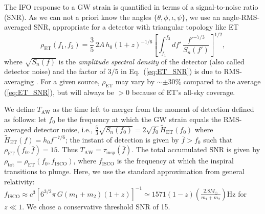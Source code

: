 \documentclass{aa}
\newcommand{\be}{\begin{equation}}
\newcommand{\ee}{\end{equation}}
\newcommand{\f}{\frac}
\begin{document}
The IFO response to a GW strain is quantified in terms of a signal-to-noise ratio (SNR).
As we can not a priori know the angles $\{\theta,\phi,\iota,\psi\}$, we use an angle-RMS-averaged SNR, 
appropriate for a detector with triangular topology like ET
%
\be
\rho_{\text{ET}}(f_1,f_2) = \frac{3}{5}\,2 A\, h_0  (1+z)^{-1/6} \left[\int_{f_1}^{f_2} d f'\, \f{f'^{-7/3}}{S_{n}(f')}\right]^{1/2} \label{eq:ET_SNR},
\ee
%
where %
$\sqrt{S_n(f)}$ is the {\it amplitude spectral density} of the detector (also called detector noise) and
the factor of $3/5$ in Eq.~(\ref{eq:ET_SNR})
is due to RMS-averaging \citep{Akcay18}. %
For a given source, $\rho_\text{ET}$ may vary by $\sim \pm 30\%$ compared to the average (\ref{eq:ET_SNR}), but will always be $>0$ because of ET's all-sky coverage.

We define $T_\text{AW}$ as the time left to merger from the moment of detection 
defined as follows: let $f_0$ be the frequency
at which the GW strain equals the RMS-averaged detector noise, i.e., $\tfrac{5}{3}\sqrt{S_n(f_0)}=2\sqrt{f_0} \tilde{H}_\text{ET}(f_0)$ where $\tilde{H}_\text{ET}(f)= h_0 f^{-7/6}$;
the instant of detection is given by 
$\bar{f}>f_0$ such that $\rho_\text{ET}(f_0,\bar{f})=15$. 
Thus $T_\text{AW} = \tau_\text{insp}(\bar{f})$.
The total accumulated SNR is given by $\rho_\text{tot}=\rho_\text{ET}(f_0, f_\text{ISCO})$, 
where $f_\text{ISCO}$ is the frequency at which the inspiral transitions to plunge. 
Here, we use the standard approximation from general relativity: 
$f_\text{ISCO} \approx {c^3}\left[{6^{3/2}\pi\, G (m_1+m_2)(1+z)}\right]^{-1} \simeq {1571}(1-z) \left(\frac{2.8M_\odot}{m_1+m_2}\right)\text{Hz}$ for $z\ll 1$. 
We chose a conservative threshold SNR of 15. %
\end{document}
